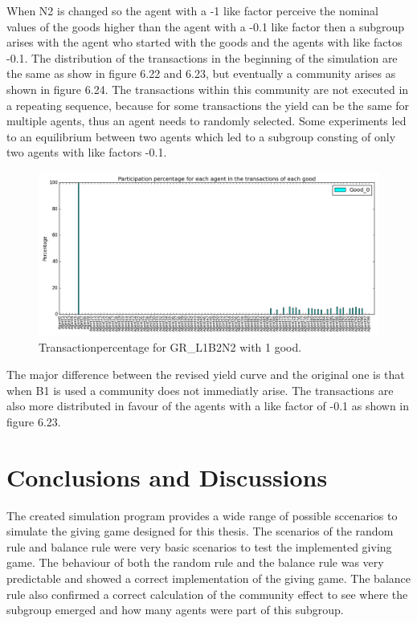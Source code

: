 \documentclass[twoside,openright]{uva-bachelor-thesis}
\begin{document}
\begin{description}
When N2 is changed so the agent with a -1 like factor perceive the nominal values of the goods higher than the agent with a -0.1 like factor then a subgroup arises with the agent who started with the goods and the agents with like factos -0.1. The distribution of the transactions in the beginning of the simulation are the same as show in figure 6.22 and 6.23, but eventually a community arises as shown in figure 6.24. The transactions within this community are not executed in a repeating sequence, because for some transactions the yield can be the same for multiple agents, thus an agent needs to randomly selected. Some experiments  led to an equilibrium  between two agents which led to a subgroup consting of only two agents with like factors -0.1.
\begin{figure}[h!]
  \centering
\includegraphics[scale=0.4]{Simulation2_figures/GR_L1B2N2_321_4k} 
  \caption{Transactionpercentage for GR\_L1B2N2 with 1 good.}
\end{figure}

\end{description}

The major difference between the revised yield curve and the original one is that when B1 is used a community does not immediatly arise. The transactions are also more distributed in favour of the agents with a like factor of -0.1 as shown in figure  6.23. 










\chapter{Conclusions and Discussions}
The created simulation program provides a wide range of possible sccenarios to simulate the giving game designed for this thesis. The scenarios of the random rule and balance rule were very basic scenarios to test the implemented giving game. The behaviour of both the random rule and the balance rule was very predictable and showed a correct implementation of the giving game. The balance rule also confirmed a correct calculation of the community effect to see where the subgroup emerged and how many agents were part of this subgroup.
\end{document}
